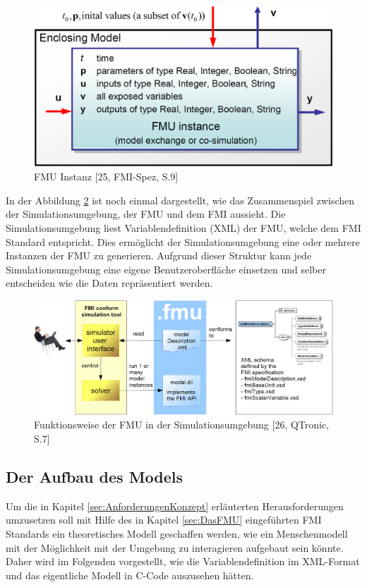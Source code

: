 \begin{figure}[h]
	\centering
	\includegraphics[width=0.5\linewidth]{Bilder/A21_FMIBlock}
	\caption{FMU Instanz [25, FMI-Spez, S.9]}
	\label{fig:FMIBlock}
\end{figure}
\newline
In der Abbildung \ref{fig:FMUEinordnung} ist noch einmal dargestellt, wie das Zusammenspiel zwischen der Simulationsumgebung, der FMU und dem FMI aussieht. Die Simulationsumgebung liest Variablendefinition (XML) der FMU, welche dem FMI Standard entspricht. Dies ermöglicht der Simulationsumgebung eine oder mehrere Instanzen der FMU zu generieren. Aufgrund dieser Struktur kann jede Simulationsumgebung eine eigene Benutzeroberfläche einsetzen und selber entscheiden wie die Daten repräsentiert werden.
\begin{figure}[h]
	\centering
	\includegraphics[width=1\linewidth]{Bilder/A22_User-FMU-FMI}
	\caption{Funktionsweise der FMU in der Simulationsumgebung [26, QTronic, S.7]}
	\label{fig:FMUEinordnung}
\end{figure}

\subsection{Der Aufbau des Models}\label{sec:ModelAufbau}
Um die in Kapitel \ref*{sec:AnforderungenKonzept} erläuterten Herausforderungen umzusetzen soll mit Hilfe des in Kapitel \ref*{sec:DasFMU} eingeführten FMI Standards ein theoretisches Modell geschaffen werden, wie ein Menschenmodell mit der Möglichkeit mit der Umgebung zu interagieren aufgebaut sein könnte. Daher wird im Folgenden vorgestellt, wie die Variablendefinition im XML-Format und das eigentliche Modell in C-Code auszusehen hätten.

